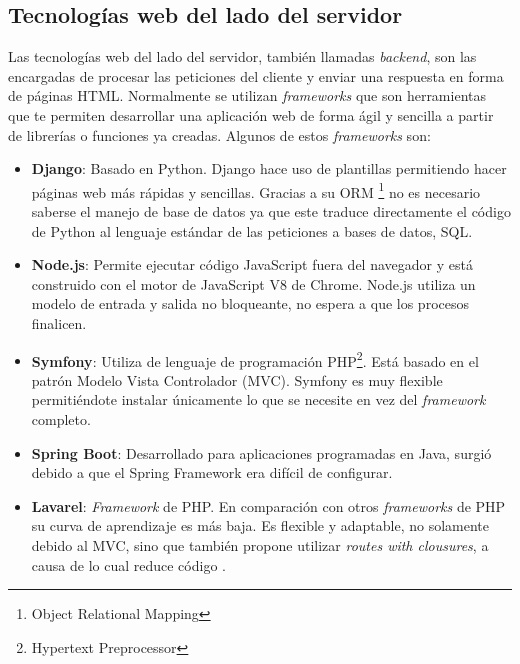 \subsection{Tecnologías web del lado del servidor}
Las tecnologías web del lado del servidor, también llamadas \textit{backend}, son las encargadas de procesar las peticiones del cliente y enviar una respuesta en forma de páginas HTML. Normalmente se utilizan \textit{frameworks }que son herramientas que te permiten desarrollar una aplicación web de forma ágil y sencilla a partir de librerías o funciones ya creadas. Algunos de estos \textit{frameworks} son:

\begin{itemize}
\item \textbf{Django}: Basado en Python. Django hace uso de plantillas permitiendo hacer páginas web más rápidas y sencillas. Gracias a su ORM \footnote{Object Relational Mapping} no es necesario saberse el manejo de base de datos ya que este traduce directamente el código de Python al lenguaje estándar de las peticiones a bases de datos, SQL.
\item \textbf{Node.js}: Permite ejecutar código JavaScript fuera del navegador y está construido con el motor de JavaScript V8 de Chrome. Node.js utiliza un modelo de entrada y salida no bloqueante, no espera a que los procesos finalicen.
\item \textbf{Symfony}: Utiliza de lenguaje de programación PHP\footnote{Hypertext Preprocessor}. Está basado en el patrón Modelo Vista Controlador (MVC). Symfony es muy flexible permitiéndote instalar únicamente lo que se necesite en vez del \textit{framework} completo.
  \item \textbf{Spring Boot}: Desarrollado para aplicaciones programadas en Java, surgió debido a que el Spring Framework era difícil de configurar. 
\item \textbf{Lavarel}: \textit{Framework} de PHP. En comparación con otros \textit{frameworks } de PHP su curva de aprendizaje es más baja. Es flexible y adaptable, no solamente debido al MVC, sino que también propone utilizar \textit{routes with clousures}, a causa de lo cual reduce código \cite{lavarel}.
\end{itemize}

